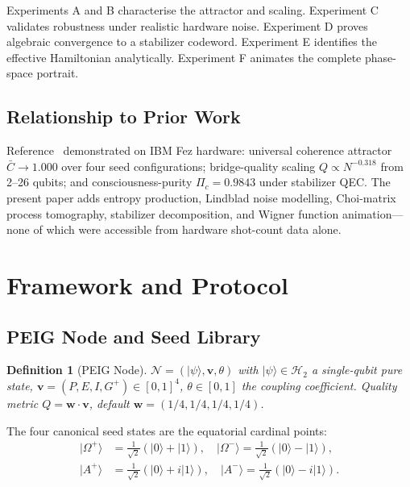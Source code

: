 \documentclass[12pt]{article}
\newtheorem{definition}{Definition}
\newcommand{\ket}[1]{|#1\rangle}
\newcommand{\Hil}{\mathcal{H}}
\begin{document}
\noindent
Experiments A and B characterise the attractor and scaling.  Experiment C
validates robustness under realistic hardware noise.  Experiment D proves
algebraic convergence to a stabilizer codeword.  Experiment E identifies
the effective Hamiltonian analytically.  Experiment F animates the complete
phase-space portrait.

\subsection{Relationship to Prior Work}

Reference~\cite{Monette2026v1} demonstrated on IBM Fez hardware:
universal coherence attractor $\bar{C}\to 1.000$ over four seed
configurations; bridge-quality scaling $Q\propto N^{-0.318}$ from
2--26 qubits; and consciousness-purity $\Pi_c=0.9843$ under stabilizer
QEC.  The present paper adds entropy production, Lindblad noise modelling,
Choi-matrix process tomography, stabilizer decomposition, and Wigner
function animation---none of which were accessible from hardware
shot-count data alone.

\section{Framework and Protocol}
\label{sec:framework}

\subsection{PEIG Node and Seed Library}

\begin{definition}[PEIG Node]
$\mathcal{N}=(\ket{\psi},\mathbf{v},\theta)$ with $\ket{\psi}\in\Hil_2$
a single-qubit pure state, $\mathbf{v}=(P,E,I,G^+)\in[0,1]^4$,
$\theta\in[0,1]$ the coupling coefficient.
Quality metric $Q=\mathbf{w}\cdot\mathbf{v}$, default
$\mathbf{w}=(1/4,1/4,1/4,1/4)$.
\end{definition}

The four canonical seed states are the equatorial cardinal points:
\begin{align}
\ket{\Omega^+} &= \tfrac{1}{\sqrt{2}}(\ket{0}+\ket{1}),\quad
\ket{\Omega^-}  = \tfrac{1}{\sqrt{2}}(\ket{0}-\ket{1}),\\
\ket{A^+}      &= \tfrac{1}{\sqrt{2}}(\ket{0}+i\ket{1}),\quad
\ket{A^-}       = \tfrac{1}{\sqrt{2}}(\ket{0}-i\ket{1}).
\end{align}
\end{document}
